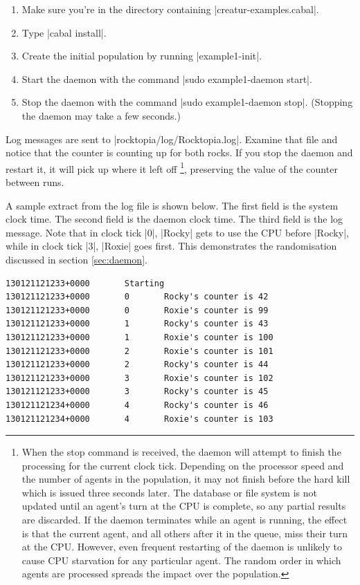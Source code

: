 \documentclass[a4paper,10pt]{report}
\begin{document}
\begin{enumerate}
\item Make sure you're in the directory containing |creatur-examples.cabal|.
\item Type |cabal install|.
\item Create the initial population by running |example1-init|.
\item Start the daemon with the command |sudo example1-daemon start|.
\item Stop the daemon with the command |sudo example1-daemon stop|.
(Stopping the daemon may take a few seconds.)
\end{enumerate}

Log messages are sent to |rocktopia/log/Rocktopia.log|.
Examine that file and notice that the counter is counting up for both rocks.
If you stop the daemon and restart it, it will pick up where it left off
\footnote{When the stop command is received, the daemon will attempt
to finish the processing for the current clock tick.
Depending on the processor speed and the number of agents in the population,
it may not finish before the hard kill which is issued three seconds later.
The database or file system is not updated until an agent's turn at the CPU 
is complete, so any partial results are discarded.
If the daemon terminates while an agent is running,
the effect is that the current agent, and all others after it in the queue,
miss their turn at the CPU.
However, even frequent restarting of the daemon
is unlikely to cause CPU starvation for any particular agent.
The random order in which agents are processed spreads the impact
over the population.}, preserving the value of the 
counter between runs.

A sample extract from the log file is shown below.
The first field is the system clock time.
The second field is the daemon clock time.
The third field is the log message.
Note that in clock tick |0|, |Rocky| gets to use the CPU before |Rocky|,
while in clock tick |3|, |Roxie| goes first.
This demonstrates the randomisation discussed in section \ref{sec:daemon}.

\begin{verbatim}
130121121233+0000       Starting
130121121233+0000       0       Rocky's counter is 42
130121121233+0000       0       Roxie's counter is 99
130121121233+0000       1       Rocky's counter is 43
130121121233+0000       1       Roxie's counter is 100
130121121233+0000       2       Roxie's counter is 101
130121121233+0000       2       Rocky's counter is 44
130121121233+0000       3       Roxie's counter is 102
130121121233+0000       3       Rocky's counter is 45
130121121234+0000       4       Rocky's counter is 46
130121121234+0000       4       Roxie's counter is 103
\end{verbatim}
\end{document}

